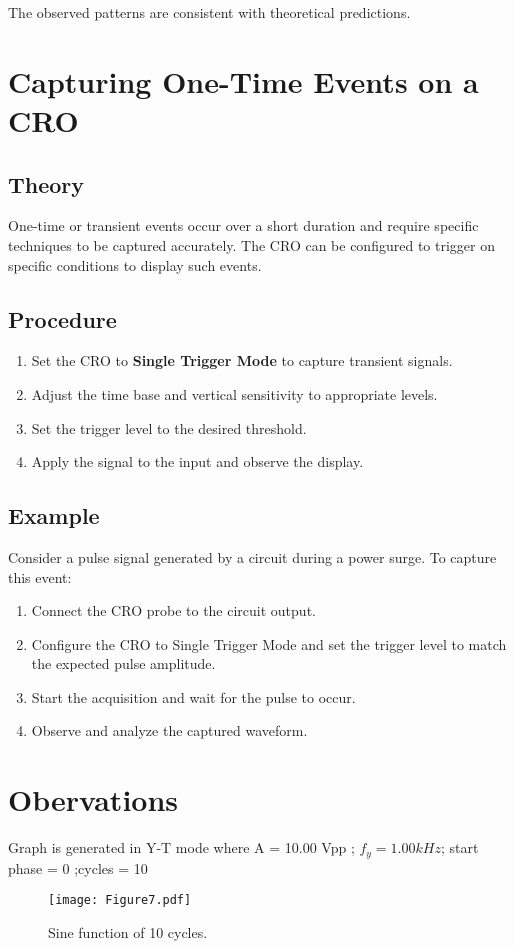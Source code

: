 \documentclass[a4paper,12pt]{article}
\begin{document}
The observed patterns are consistent with theoretical predictions.

\section*{Capturing One-Time Events on a CRO}

\subsection*{Theory}
One-time or transient events occur over a short duration and require specific techniques to be captured accurately. The CRO can be configured to trigger on specific conditions to display such events.

\subsection*{Procedure}
\begin{enumerate}
    \item Set the CRO to \textbf{Single Trigger Mode} to capture transient signals.
    \item Adjust the time base and vertical sensitivity to appropriate levels.
    \item Set the trigger level to the desired threshold.
    \item Apply the signal to the input and observe the display.
\end{enumerate}

\subsection*{Example}
Consider a pulse signal generated by a circuit during a power surge. To capture this event:
\begin{enumerate}
    \item Connect the CRO probe to the circuit output.
    \item Configure the CRO to Single Trigger Mode and set the trigger level to match the expected pulse amplitude.
    \item Start the acquisition and wait for the pulse to occur.
    \item Observe and analyze the captured waveform.
\end{enumerate}
\section*{Obervations}
Graph is generated in Y-T mode where A = 10.00 Vpp ; $f_y = 1.00kHz$; start phase = 0 ;cycles = 10
 \begin{figure}[H]
    \centering
    \texttt{[image: Figure7.pdf]}
    \caption{Sine function of 10 cycles.}
    \label{fig:Sin}
    \end{figure}
\end{document}
